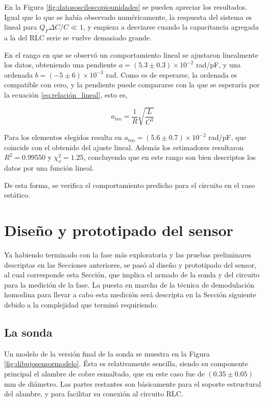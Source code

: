 En la Figura \ref{fig:datososciloscopiounidades} se pueden apreciar los resultados. Igual que lo que se había observado numéricamente, la respuesta del sistema es lineal para $Q_F\Delta C/C\ll1$, y empieza a desviarse cuando la capacitancia agregada a la del RLC serie se vuelve demasiado grande. %

En el rango en que se observó un comportamiento lineal se ajustaron linealmente los datos, obteniendo una pendiente $a=(5.3\pm0.3)\times10^{-2}$ rad/pF, y una ordenada $b=(-5\pm6)\times10^{-3}$ rad. Como es de esperarse, la ordenada es compatible con cero, y la pendiente puede compararse  con la que se esperaría por la ecuación \eqref{eq:relación_lineal}, esto es, 

\begin{equation}
	a_{\text{teo}}=\frac{1}{R}\sqrt{\frac{L}{C^3}}
\end{equation}

Para los elementos elegidos resulta en $a_{\text{teo}}=(5.6\pm0.7)\times10^{-2}$ rad/pF, que coincide con el obtenido del ajuste lineal. Además los estimadores resultaron $R^2=0.99550$ y $\chi_\nu^2=1.25$, concluyendo que en este rango son bien descriptos los datos por una función lineal. 

De esta forma, se verifica el comportamiento predicho para el circuito en el caso estático. %


\section{Diseño y prototipado del sensor} %
\label{sec:prototipado}  
Ya habiendo terminado con la fase más exploratoria y las pruebas preliminares descriptas en las Secciones anteriores, se pasó al diseño y prototipado del sensor, al cual corresponde esta Sección, que implica el armado de la sonda y del circuito para la medición de la fase. La puesta en marcha de la técnica de demodulación homodina para llevar a cabo esta medición será descripta en la Sección siguiente debido a la complejidad que terminó requiriendo. %

\subsection{La sonda} 
Un modelo de la versión final de la sonda se muestra en la Figura \ref{fig:dibujosensormodelo}. Ésta es relativamente sencilla, siendo su componente principal el alambre de cobre esmaltado, que en este caso fue de $(0.35\pm0.05)$ mm de diámetro. Las partes restantes son básicamente para el soporte estructural del alambre, y para facilitar su conexión al circuito RLC. 

